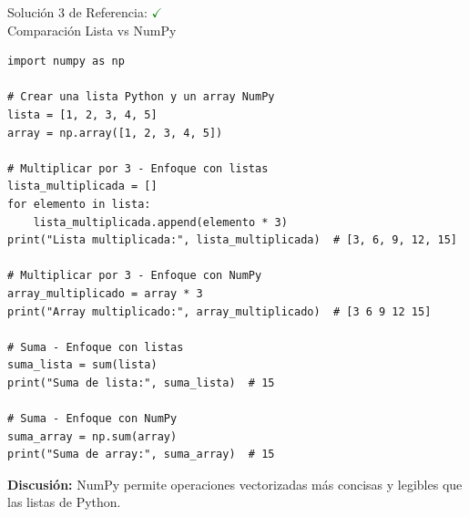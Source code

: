 \documentclass[10pt]{beamer}
\begin{document}
\begin{solutionblock}
\begin{frame}[fragile]{Solución 3 de Referencia: \hfill \textcolor{green}{$\checkmark$} \\ Comparación Lista vs NumPy}
\begin{verbatim}
import numpy as np

# Crear una lista Python y un array NumPy
lista = [1, 2, 3, 4, 5]
array = np.array([1, 2, 3, 4, 5])

# Multiplicar por 3 - Enfoque con listas
lista_multiplicada = []
for elemento in lista:
    lista_multiplicada.append(elemento * 3)
print("Lista multiplicada:", lista_multiplicada)  # [3, 6, 9, 12, 15]

# Multiplicar por 3 - Enfoque con NumPy
array_multiplicado = array * 3
print("Array multiplicado:", array_multiplicado)  # [3 6 9 12 15]

# Suma - Enfoque con listas
suma_lista = sum(lista)
print("Suma de lista:", suma_lista)  # 15

# Suma - Enfoque con NumPy
suma_array = np.sum(array)
print("Suma de array:", suma_array)  # 15
\end{verbatim}
\textbf{Discusión:} NumPy permite operaciones vectorizadas más concisas y legibles que las listas de Python.
\end{frame}
\end{solutionblock}
\end{document}
